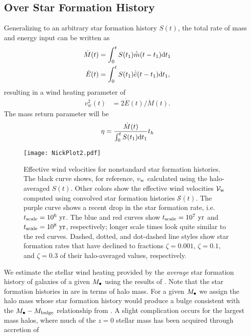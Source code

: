 \subsection{Over Star Formation History}
Generalizing to an arbitrary star formation history $S(t)$, the total rate of mass and energy input can be written as
\begin{align} 
  \dot{M}(t) &= \int_0^t S(t_1) \dot{\bar{m}}(t-t_1){\rm
      d}t_1 \label{eq:MDotSFH}\\
  \dot{E}(t) &= \int_0^t S(t_1) \dot{\bar{e}}(t-t_1){\rm
      d}t_1, \label{eq:EDotSFH}
\end{align}
resulting in a wind heating parameter of 
\begin{align}
  v_w^2(t) &=2 \dot{E}(t)/\dot{M}(t).
\end{align}
The mass return parameter will be
\begin{align}
\eta = \frac{\dot{M}(t)}{\int_0^t S(t_1) {\rm d}t_1} t_h
\end{align}
 \begin{figure}
  \texttt{[image: NickPlot2.pdf]}
  \caption{\label{NickPlot2} Effective wind velocities for
  nonstandard star formation histories.  The black curve shows, for reference, $v_{\rm w}$ calculated using the halo-averaged $S(t)$.  Other colors show the effective wind velocities $\mathcal{V}_{\rm w}$ computed using convolved star formation histories $\mathcal{S}(t)$.  The purple curve shows a recent drop in the star formation rate, i.e. $t_{\rm scale}=10^6~{\rm yr}$.  The blue and red curves show $t_{\rm scale}=10^7~{\rm yr}$ and $t_{\rm scale}=10^8~{\rm yr}$, respectively; longer scale times look quite similar to the red curves.  Dashed, dotted, and dot-dashed line styles show star formation rates that have declined to fractions $\zeta = 0.001$, $\zeta = 0.1$, and $\zeta = 0.3$ of their halo-averaged values, respectively. }
  \end{figure}
  We estimate the stellar wind heating provided by the {\it average}
  star formation history of galaxies of a given $M_{\bullet}$ using the
  results of \citet[eqs.~17-20]{MosterNaab+:2013a}.  Note that the
  star formation histories in \citet{MosterNaab+:2013a} are in terms
  of halo mass. For a given $M_{\bullet}$ we assign the halo mass whose star
  formation history would produce a bulge consistent with the
  $M_{\bullet}-M_{\rm bulge}$ relationship from \citet{McConnellMa:2013a}.  A
  slight complication occurs for the largest mass halos, where much of
  the $z=0$ stellar mass has been acquired through accretion of
